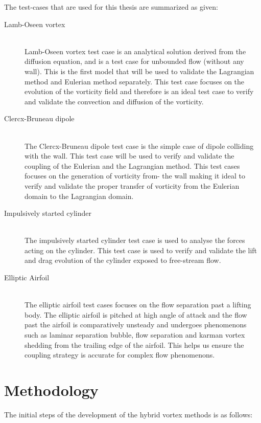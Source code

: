 The test-cases that are used for this thesis are summarized as given:

	\begin{description}
	\item[Lamb-Oseen vortex] \cite{Lamb1993} \cite{Tryggeson2007} \hfill\\
	Lamb-Oseen vortex test case is an analytical solution derived from the diffusion equation, and is a test case for unbounded flow (without any wall). This is the first model that will be used to validate the Lagrangian method and Eulerian method separately. This test case focuses on the evolution of the vorticity field and therefore is an ideal test case to verify and validate the convection and diffusion of the vorticity.
	\item[Clercx-Bruneau dipole] \cite{Clercx2006}\hfill\\
	The Clercx-Bruneau dipole test case is the simple case of dipole colliding with the wall. This test case will be used to verify and validate the coupling of the Eulerian and the Lagrangian method. This test cases focuses on the generation of vorticity from- the wall making it ideal to verify and validate the proper transfer of vorticity from the Eulerian domain to the Lagrangian domain.
	\item[Impulsively started cylinder] \cite{LEONARD1995} \cite{Chang2006} \cite{Chassaing1986} \cite{Lecointe1985}\hfill\\
	The impulsively started cylinder test case is used to analyse the forces acting on the cylinder. This test case is used to verify and validate the lift and drag evolution of the cylinder exposed to free-stream flow.
	\item[Elliptic Airfoil] \cite{Nair1997}\hfill\\
	The elliptic airfoil test cases focuses on the flow separation past a lifting body. The elliptic airfoil is pitched at high angle of attack and the flow past the airfoil is comparatively unsteady and undergoes phenomenons such as laminar separation bubble, flow separation and karman vortex shedding from the trailing edge of the airfoil. This helps us ensure the coupling strategy is accurate for complex flow phenomenons.
	\end{description}

\section{Methodology}
The initial steps of the development of the hybrid vortex methods is as follows:

